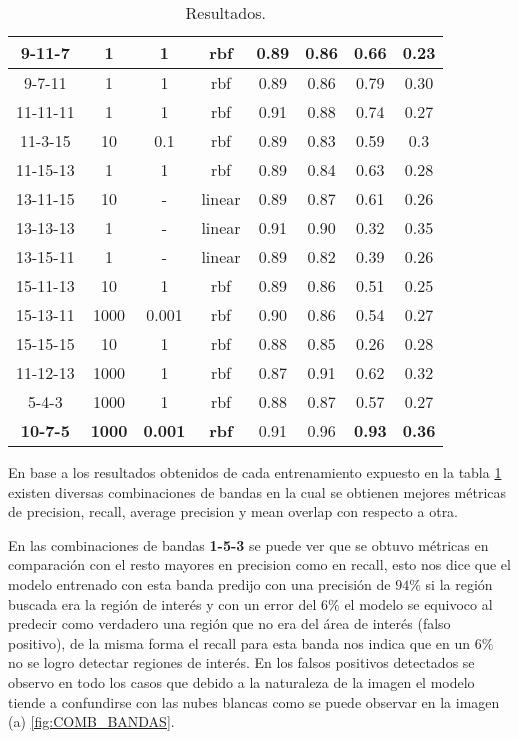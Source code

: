 \begin{table}[H]
\begin{center}
\begin{tabular}{|c|c|c|c|c|c|c|c|}
\multicolumn{1}{|c|}{9-11-7} & 1 & 1 & rbf & 0.89 & 0.86 & 0.66 & 0.23 \\ \hline
\multicolumn{1}{|c|}{9-7-11} & 1 & 1 & rbf & 0.89 & 0.86 & 0.79 & 0.30\\ \hline
\multicolumn{1}{|c|}{11-11-11} & 1 & 1 & rbf & 0.91 & 0.88 & 0.74 & 0.27 \\ \hline
\multicolumn{1}{|c|}{11-3-15} & 10 & 0.1 & rbf & 0.89 & 0.83 & 0.59 & 0.3 \\ \hline
\multicolumn{1}{|c|}{11-15-13} & 1 & 1 & rbf & 0.89 & 0.84 & 0.63 & 0.28 \\ \hline
\multicolumn{1}{|c|}{13-11-15} & 10 & - & linear & 0.89 & 0.87 & 0.61 & 0.26 \\ \hline
\multicolumn{1}{|c|}{13-13-13} & 1 & - & linear & 0.91 & 0.90 & 0.32 & 0.35 \\ \hline
\multicolumn{1}{|c|}{13-15-11} & 1 & - & linear & 0.89 & 0.82 & 0.39 & 0.26 \\ \hline
\multicolumn{1}{|c|}{15-11-13} & 10 & 1 & rbf & 0.89 & 0.86 & 0.51 & 0.25 \\ \hline
\multicolumn{1}{|c|}{15-13-11} & 1000 & 0.001 & rbf & 0.90 & 0.86 & 0.54 & 0.27 \\ \hline
\multicolumn{1}{|c|}{15-15-15} & 10 & 1 & rbf & 0.88 & 0.85 & 0.26 & 0.28 \\ \hline
\multicolumn{1}{|c|}{11-12-13} & 1000 & 1 & rbf & 0.87 & 0.91 & 0.62 & 0.32 \\ \hline
\multicolumn{1}{|c|}{5-4-3} & 1000 & 1 & rbf & 0.88 & 0.87 & 0.57 & 0.27 \\ \hline
\multicolumn{1}{|c|}{\textbf{10-7-5}} & \textbf{1000} &\textbf{ 0.001} & \textbf{rbf} & 0.91 & 0.96 &\cellcolor{blue!25}\textbf{0.93} & \cellcolor{blue!25}\textbf{0.36}\\ \hline
\end{tabular}
\end{center}\caption{Resultados.}\label{tab:entrenam-result}
\end{table}

En base a los resultados obtenidos de cada entrenamiento expuesto en la tabla \ref{tab:entrenam-result} existen diversas combinaciones de bandas en la cual se obtienen mejores métricas de precision, recall, average precision y mean overlap con respecto a otra.  

En las combinaciones de bandas \textbf{1-5-3} se puede ver que se obtuvo métricas en comparación con el resto mayores en precision como en recall, esto nos dice que el modelo entrenado con esta banda predijo con una precisión de  $94\%$  si la región buscada era la región de interés y con un error del $6\%$ el modelo se equivoco al predecir como verdadero una región que no era del área de interés (falso positivo), de la misma forma el recall para esta banda nos indica que en un $6\%$ no se logro detectar regiones de interés. En los falsos positivos detectados se observo en todo los casos que debido a la naturaleza de la imagen el modelo tiende a confundirse con las nubes blancas como se puede observar en la imagen (a) \ref{fig:COMB_BANDAS}.

